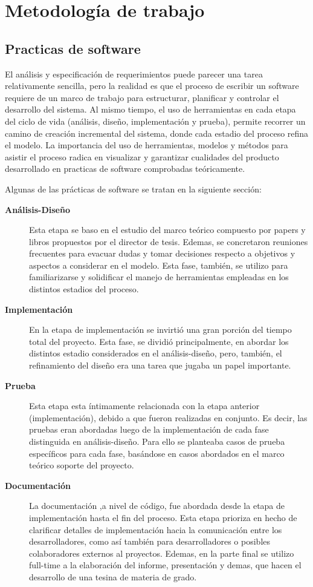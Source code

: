 \chapter{Metodolog\'ia de trabajo}
\label{chap:metodologia}
\minitoc


\section{Practicas de software}
El análisis y especificación de requerimientos puede parecer una tarea relativamente sencilla, pero la realidad es que el proceso de escribir un software requiere de un marco de trabajo para estructurar, planificar y controlar  el desarrollo del sistema.
Al mismo tiempo, el uso de herramientas en cada etapa del ciclo de vida (análisis, diseño, implementación y prueba), permite recorrer un camino de creación incremental del sistema, donde cada estadio del proceso refina el modelo. 
La importancia del uso de herramientas, modelos y métodos para asistir el proceso radica en visualizar y garantizar cualidades del producto desarrollado en practicas de software comprobadas teóricamente. 

Algunas de las prácticas de software se tratan en la siguiente sección:
\begin{description}
\item[\textbf{Análisis-Diseño}] Esta etapa se baso en el estudio del marco teórico compuesto por papers y libros propuestos por el director de tesis. Edemas, se concretaron reuniones frecuentes para evacuar dudas y tomar decisiones respecto a objetivos y aspectos a considerar en el modelo. Esta fase, también, se utilizo para familiarizarse y solidificar el manejo de herramientas empleadas en los distintos estadios del proceso. 

\item[\textbf{Implementación}] En la etapa de implementación se invirtió una gran porción del tiempo total del proyecto. Esta fase, se dividió principalmente, en abordar los distintos estadio considerados en el análisis-diseño, pero, también, el refinamiento del diseño era una tarea que jugaba un papel importante. 


\item[\textbf{Prueba}] Esta etapa esta íntimamente relacionada con la etapa anterior (implementación), debido a que fueron realizadas en conjunto. Es decir, las pruebas eran abordadas luego de la implementación de cada fase distinguida en análisis-diseño. Para ello se planteaba casos de prueba específicos para cada fase, basándose en casos abordados en el marco teórico soporte del proyecto.


\item[\textbf{Documentación}] La documentación ,a nivel de código, fue abordada desde la etapa de implementación hasta el fin del proceso. Esta etapa prioriza en hecho de clarificar detalles de implementación hacia la comunicación entre los desarrolladores, como así también para desarrolladores o posibles colaboradores externos al proyectos.
Edemas, en la parte final se utilizo full-time a la elaboración del informe, presentación y demas, que hacen el desarrollo de una tesina de materia de grado.
\end{description}

